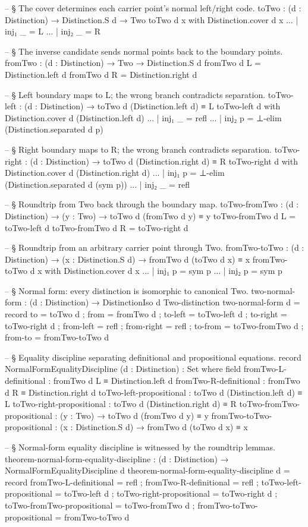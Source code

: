 \documentclass[11pt]{article}
\begin{document}
\begin{code}
-- § The cover determines each carrier point's normal left/right code.
toTwo : (d : Distinction) → Distinction.S d → Two
toTwo d x with Distinction.cover d x
... | inj₁ _ = L
... | inj₂ _ = R

-- § The inverse candidate sends normal points back to the boundary points.
fromTwo : (d : Distinction) → Two → Distinction.S d
fromTwo d L = Distinction.left d
fromTwo d R = Distinction.right d

-- § Left boundary maps to L; the wrong branch contradicts separation.
toTwo-left : (d : Distinction) → toTwo d (Distinction.left d) ≡ L
toTwo-left d with Distinction.cover d (Distinction.left d)
... | inj₁ _ = refl
... | inj₂ p = ⊥-elim (Distinction.separated d p)

-- § Right boundary maps to R; the wrong branch contradicts separation.
toTwo-right : (d : Distinction) → toTwo d (Distinction.right d) ≡ R
toTwo-right d with Distinction.cover d (Distinction.right d)
... | inj₁ p = ⊥-elim (Distinction.separated d (sym p))
... | inj₂ _ = refl

-- § Roundtrip from Two back through the boundary map.
toTwo-fromTwo : (d : Distinction) → (y : Two) → toTwo d (fromTwo d y) ≡ y
toTwo-fromTwo d L = toTwo-left d
toTwo-fromTwo d R = toTwo-right d

-- § Roundtrip from an arbitrary carrier point through Two.
fromTwo-toTwo : (d : Distinction) → (x : Distinction.S d) → fromTwo d (toTwo d x) ≡ x
fromTwo-toTwo d x with Distinction.cover d x
... | inj₁ p = sym p
... | inj₂ p = sym p

-- § Normal form: every distinction is isomorphic to canonical Two.
two-normal-form : (d : Distinction) → DistinctionIso d Two-distinction
two-normal-form d = record
  { to         = toTwo d
  ; from       = fromTwo d
  ; to-left    = toTwo-left d
  ; to-right   = toTwo-right d
  ; from-left  = refl
  ; from-right = refl
  ; to-from    = toTwo-fromTwo d
  ; from-to    = fromTwo-toTwo d
  }

-- § Equality discipline separating definitional and propositional equations.
record NormalFormEqualityDiscipline (d : Distinction) : Set where
  field
    fromTwo-L-definitional : fromTwo d L ≡ Distinction.left d
    fromTwo-R-definitional : fromTwo d R ≡ Distinction.right d
    toTwo-left-propositional : toTwo d (Distinction.left d) ≡ L
    toTwo-right-propositional : toTwo d (Distinction.right d) ≡ R
    toTwo-fromTwo-propositional : (y : Two) → toTwo d (fromTwo d y) ≡ y
    fromTwo-toTwo-propositional : (x : Distinction.S d) → fromTwo d (toTwo d x) ≡ x

-- § Normal-form equality discipline is witnessed by the roundtrip lemmas.
theorem-normal-form-equality-discipline :
  (d : Distinction) → NormalFormEqualityDiscipline d
theorem-normal-form-equality-discipline d = record
  { fromTwo-L-definitional = refl
  ; fromTwo-R-definitional = refl
  ; toTwo-left-propositional = toTwo-left d
  ; toTwo-right-propositional = toTwo-right d
  ; toTwo-fromTwo-propositional = toTwo-fromTwo d
  ; fromTwo-toTwo-propositional = fromTwo-toTwo d
  }
\end{code}
\end{document}
